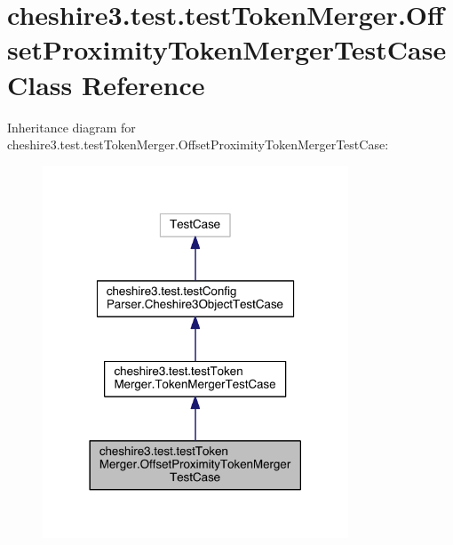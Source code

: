 \hypertarget{classcheshire3_1_1test_1_1test_token_merger_1_1_offset_proximity_token_merger_test_case}{\section{cheshire3.\-test.\-test\-Token\-Merger.\-Offset\-Proximity\-Token\-Merger\-Test\-Case Class Reference}
\label{classcheshire3_1_1test_1_1test_token_merger_1_1_offset_proximity_token_merger_test_case}
}


Inheritance diagram for cheshire3.\-test.\-test\-Token\-Merger.\-Offset\-Proximity\-Token\-Merger\-Test\-Case\-:
\nopagebreak
\begin{figure}[H]
\begin{center}
\leavevmode
\includegraphics[width=258pt]{classcheshire3_1_1test_1_1test_token_merger_1_1_offset_proximity_token_merger_test_case__inherit__graph}
\end{center}
\end{figure}



